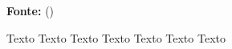 \begin{figure}[ht!]
\centering

\caption{\textmd{Texto Texto Texto Texto Texto Texto Texto}}
\label{fig:figuraex2}

\par\medskip\ABNTEXfontereduzida\selectfont\textbf{Fonte:} \citeauthor{manualufpe2020} (\citeyear{manualufpe2020}) \par\medskip
\end{figure}